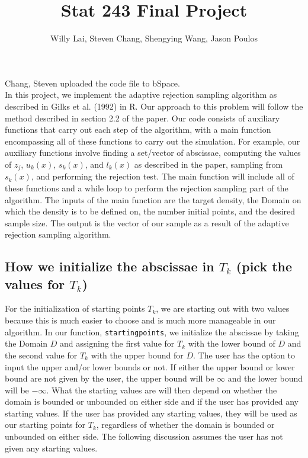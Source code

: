 \documentclass[12pt]{article}\usepackage[]{graphicx}\usepackage[]{color}
\title{Stat 243 Final Project}
\author{Willy Lai, Steven Chang, Shengying Wang, Jason Poulos}
\begin{document}


\maketitle
Chang, Steven uploaded the code file to bSpace.\\
\newline
In this project, we implement the adaptive rejection sampling algorithm as described in Gilks et al. (1992) in \textsf{R}.  Our approach to this problem will follow the method described in section 2.2 of the paper.  Our code consists of auxiliary functions that carry out each step of the algorithm, with a main function encompassing all of these functions to carry out the simulation.  For example, our auxiliary functions involve finding a set/vector of abscissae, computing the values of $z_j$, $u_k(x)$, $s_k(x)$, and $l_k(x)$ as described in the paper, sampling from $s_k(x)$, and performing the rejection test.  The main function will include all of these functions and a while loop to perform the rejection sampling part of the algorithm.  The inputs of the main function are the target density, the Domain on which the density is to be defined on, the number initial points, and the desired sample size.  The output is the vector of our sample as a result of the adaptive rejection sampling algorithm.

\subsection*{How we initialize the abscissae in $T_k$ (pick the values for $T_k$)}

For the initialization of starting points $T_k$, we are starting out with two values because this is much easier to choose and is much more manageable in our algorithm.  In our function, \texttt{startingpoints}, we initialize the abscissae by taking the Domain $D$ and assigning the first value for $T_k$ with the lower bound of $D$ and the second value for $T_k$ with the upper bound for $D$.  The user has the option to input the upper and/or lower bounds or not.  If either the upper bound or lower bound are not given by the user, the upper bound will be $\infty$ and the lower bound will be $-\infty$.  What the starting values are will then depend on whether the domain is bounded or unbounded on either side and if the user has provided any starting values.  If the user has provided any starting values, they will be used as our starting points for $T_k$, regardless of whether the domain is bounded or unbounded on either side.  The following discussion assumes the user has not given any starting values.\\
\end{document}
